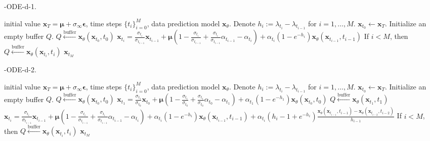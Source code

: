\begin{algorithm}[H]
    \centering
    \caption{\ourmethod-ODE-d-1.}\label{alg:ode-d-1}
    \begin{algorithmic}[1]
    \REQUIRE initial value $\boldsymbol{x}_T=\boldsymbol\mu+\sigma_\infty\boldsymbol\epsilon$, time steps $\{t_i\}_{i=0}^M$, data prediction model $\boldsymbol{x}_\theta$. Denote $h_i:=\lambda_{t_i}-\lambda_{t_{i-1}}$ for $i=1,\ldots,M$.
        \STATE $\boldsymbol{x}_{t_0}\leftarrow\boldsymbol{x}_T$. Initialize an empty buffer $Q$.
        \STATE $Q\xleftarrow{\text{buffer}}\boldsymbol{x}_\theta(\boldsymbol{x}_{t_0},t_0)$
        \STATE $\boldsymbol{x}_{t_i}=\frac{\sigma_{t_i}}{\sigma_{t_{i-1}}}\boldsymbol{x}_{t_{i-1}}
        +\boldsymbol\mu\left(1-\frac{\sigma_{t_i}}{\sigma_{t_{i-1}}}+\frac{\sigma_{t_i}}{\sigma_{t_{i-1}}}\alpha_{t_{i-1}}-\alpha_{t_i} \right)
        +\alpha_{t_i}\left(1-e^{-h_i}\right)\boldsymbol{x}_\theta(\boldsymbol{x}_{t_{i-1}},t_{i-1})$
        \STATE If $i < M$, then $Q \xleftarrow{\text{buffer}} \boldsymbol{x}_\theta(\boldsymbol{x}_{t_i}, t_i)$
        \ENDFOR
        \RETURN $\boldsymbol{x}_{t_M}$
    \end{algorithmic}
\end{algorithm}

\begin{algorithm}[H]
    \centering
    \caption{\ourmethod-ODE-d-2.}\label{alg:ode-d-2}
    \begin{algorithmic}[1]
    \REQUIRE initial value $\boldsymbol{x}_T=\boldsymbol\mu+\sigma_\infty\boldsymbol\epsilon$, time steps $\{t_i\}_{i=0}^M$, data prediction model $\boldsymbol{x}_\theta$. Denote $h_i:=\lambda_{t_i}-\lambda_{t_{i-1}}$ for $i=1,\ldots,M$.
        \STATE $\boldsymbol{x}_{t_0}\leftarrow\boldsymbol{x}_T$. Initialize an empty buffer $Q$.
        \STATE $Q\xleftarrow{\text{buffer}}\boldsymbol{x}_\theta(\boldsymbol{x}_{t_0},t_0)$
        \STATE $\boldsymbol{x}_{t_1}=\frac{\sigma_{t_1}}{\sigma_{t_{0}}}\boldsymbol{x}_{t_{0}}
        +\boldsymbol\mu\left(1-\frac{\sigma_{t_1}}{\sigma_{t_{0}}}+\frac{\sigma_{t_1}}{\sigma_{t_{0}}}\alpha_{t_{0}}-\alpha_{t_1} \right)
        +\alpha_{t_1}\left(1-e^{-h_1}\right)\boldsymbol{x}_\theta(\boldsymbol{x}_{t_{0}},t_{0})$
        \STATE $Q\xleftarrow{\text{buffer}}\boldsymbol{x}_\theta(\boldsymbol{x}_{t_1},t_1)$
        \STATE $\boldsymbol{x}_{t_i}=\frac{\sigma_{t_i}}{\sigma_{t_{i-1}}}\boldsymbol{x}_{t_{i-1}}
        +\boldsymbol\mu\left(1-\frac{\sigma_{t_i}}{\sigma_{t_{i-1}}}+\frac{\sigma_{t_i}}{\sigma_{t_{i-1}}}\alpha_{t_{i-1}}-\alpha_{t_i} \right)
        +\alpha_{t_i}\left(1-e^{-h_i}\right)\boldsymbol{x}_\theta(\boldsymbol{x}_{t_{i-1}},t_{i-1})
        +\alpha_{t_i}\left(h_i-1+e^{-h_i}\right)\frac{\boldsymbol x_\theta(\boldsymbol{x}_{t_{i-1}},t_{i-1})-\boldsymbol x_\theta(\boldsymbol{x}_{t_{i-2}},t_{i-2})}{h_{i-1}}$
        \STATE If $i < M$, then $Q \xleftarrow{\text{buffer}} \boldsymbol{x}_\theta(\boldsymbol{x}_{t_i}, t_i)$
        \ENDFOR
        \RETURN $\boldsymbol{x}_{t_M}$
    \end{algorithmic}
\end{algorithm}